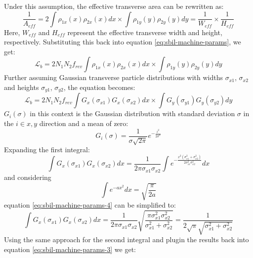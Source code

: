 Under this assumption, the effective transverse area can be rewritten as:
\begin{equation}
    \label{eq:effective-area}
    \frac{1}{A_{eff}} = 2 \int \rho_{1x}(x) \rho_{2x}(x) dx \times \int \rho_{1y}(y) \rho_{2y}(y) dy = \frac{1}{W_{eff}} \times \frac{1}{H_{eff}}
\end{equation}
Here, $W_{eff}$ and $H_{eff}$ represent the effective transverse width and height, respectively. Substituting this back into equation \ref{eq:sbil-machine-params}, we get:
\begin{equation}
    \label{eq:sbil-machine-params-2}
    \mathcal{L}_b = 2 N_1 N_2 f_{rev} \int \rho_{1x}(x) \rho_{2x}(x) dx \times \int \rho_{1y}(y) \rho_{2y}(y) dy
\end{equation}
Further assuming Gaussian transverse particle distributions with widths $\sigma_{x1}$, $\sigma_{x2}$ and heights $\sigma_{y1}$, $\sigma_{y2}$, the equation becomes:
\begin{equation}
    \label{eq:sbil-machine-params-3}
    \mathcal{L}_b = 2 N_1 N_2 f_{rev} \int G_x (\sigma_{x1}) G_x (\sigma_{x2}) dx \times \int G_y (\sigma_{y1}) G_y (\sigma_{y2}) dy
\end{equation}
$G_i (\sigma)$ in this context is the Gaussian distribution with standard deviation $\sigma$ in the $i \in {x,y}$ direction and a mean of zero:
\begin{equation}
    \label{eq:gaussian-distribution}
    G_i (\sigma) = \frac{1}{\sigma \sqrt{2 \pi}} e^{-\frac{i^2}{2 \sigma^2}}
\end{equation}
Expanding the first integral:
\begin{equation}
	\label{eq:sbil-machine-params-4}
	\int G_x (\sigma_{x1}) G_x (\sigma_{x2}) dx = \frac{1}{2 \pi \sigma_{x1} \sigma_{x2}} \int e^{-\frac{x^2 \left( \sigma_{x1}^2 + \sigma_{x2}^2 \right)}{2 \sigma_{x1}^2 \sigma_{x2}^2}} dx
\end{equation}
and considering
\begin{equation}
	\int e^{-a x^2} dx = \sqrt{\frac{\pi}{2a}}
\end{equation}
equation \ref{eq:sbil-machine-params-4} can be simplified to:
\begin{equation}
	\label{eq:sbil-machine-params-5}
	\int G_x (\sigma_{x1}) G_x (\sigma_{x2}) dx = \frac{1}{2 \pi \sigma_{x1} \sigma_{x2}} \sqrt {\frac{\pi \sigma_{x1}^2 \sigma_{x2}^2}{\sigma_{x1}^2 + \sigma_{x2}^2}} = \frac{1}{2 \sqrt{\pi} \sqrt{\sigma_{x1}^2 + \sigma_{x2}^2}}
\end{equation}
Using the same approach for the second integral and plugin the results back into equation \ref{eq:sbil-machine-params-3} we get: 
